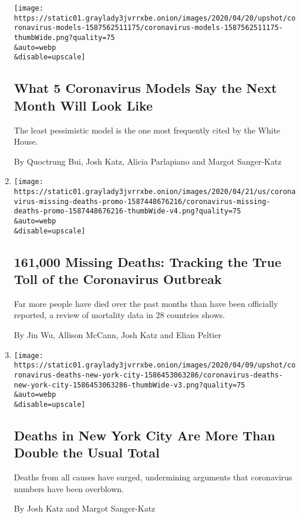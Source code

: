 \begin{enumerate}
  \texttt{[image: https://static01.graylady3jvrrxbe.onion/images/2020/04/20/upshot/coronavirus-models-1587562511175/coronavirus-models-1587562511175-thumbWide.png?quality=75\\\&auto=webp\\\&disable=upscale]}

  \hypertarget{what-5-coronavirus-models-say-the-next-month-will-look-like}{%
  \subsection{What 5 Coronavirus Models Say the Next Month Will Look
  Like}\label{what-5-coronavirus-models-say-the-next-month-will-look-like}}

  The least pessimistic model is the one most frequently cited by the
  White House.

  By Quoctrung Bui, Josh Katz, Alicia Parlapiano and Margot Sanger-Katz
\item
  \href{/interactive/2020/04/21/world/coronavirus-missing-deaths.html}{}

  \texttt{[image: https://static01.graylady3jvrrxbe.onion/images/2020/04/21/us/coronavirus-missing-deaths-promo-1587448676216/coronavirus-missing-deaths-promo-1587448676216-thumbWide-v4.png?quality=75\\\&auto=webp\\\&disable=upscale]}

  \hypertarget{161000-missing-deaths-tracking-the-true-toll-of-the-coronavirus-outbreak}{%
  \subsection{161,000 Missing Deaths: Tracking the True Toll of the
  Coronavirus
  Outbreak}\label{161000-missing-deaths-tracking-the-true-toll-of-the-coronavirus-outbreak}}

  Far more people have died over the past months than have been
  officially reported, a review of mortality data in 28 countries shows.

  By Jin Wu, Allison McCann, Josh Katz and Elian Peltier
\item
  \href{/interactive/2020/04/10/upshot/coronavirus-deaths-new-york-city.html}{}

  \texttt{[image: https://static01.graylady3jvrrxbe.onion/images/2020/04/09/upshot/coronavirus-deaths-new-york-city-1586453063286/coronavirus-deaths-new-york-city-1586453063286-thumbWide-v3.png?quality=75\\\&auto=webp\\\&disable=upscale]}

  \hypertarget{deaths-in-new-york-city-are-more-than-double-the-usual-total}{%
  \subsection{Deaths in New York City Are More Than Double the Usual
  Total}\label{deaths-in-new-york-city-are-more-than-double-the-usual-total}}

  Deaths from all causes have surged, undermining arguments that
  coronavirus numbers have been overblown.

  By Josh Katz and Margot Sanger-Katz
\end{enumerate}


